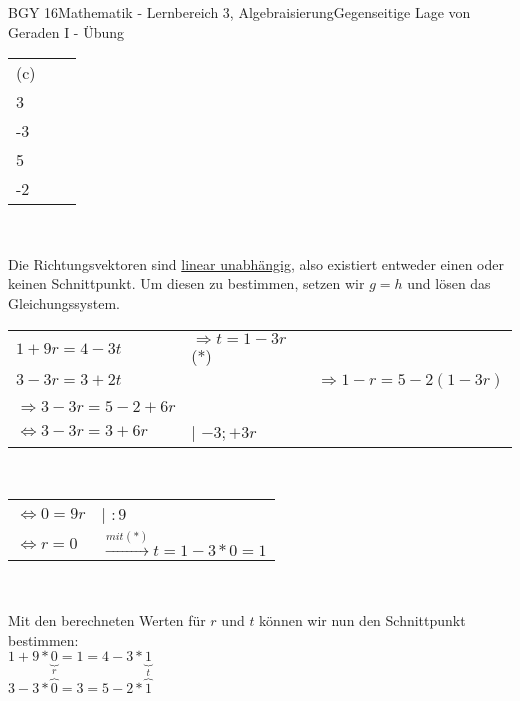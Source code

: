 \documentclass[oneside,openany,headings=optiontotoc,11pt,numbers=noenddot]{scrreprt}
\begin{document}
\begin{worksheet}{BGY 16}{Mathematik - Lernbereich 3, Algebraisierung}{Gegenseitige Lage von Geraden I - Übung}
\begin{framed}
			\begin{tabularx}{\textwidth}{lXX}
				(c) & \(g: \vec{x} = \left(\begin{array}{c}1\\3\end{array}\right) + r\left(\begin{array}{c}9\\-3\end{array}\right)\) &	\(h: \vec{x} = \left(\begin{array}{c}4\\5\end{array}\right) + t\left(\begin{array}{c}-3\\-2\end{array}\right)\)\\
			\end{tabularx}\\
			\par\noindent
			Die Richtungsvektoren sind \color{blue}\underline{linear unabhängig}\normalcolor{}, also existiert entweder \color{red}einen\normalcolor{} oder \color{red}keinen\normalcolor{} Schnittpunkt. Um diesen zu bestimmen, setzen wir \(g=h\) und lösen das Gleichungssystem.\\
			\par\noindent
			\begin{tabular}{lll}
				\(1+9r = 4 -3t\) & \(\Rightarrow t = 1 - 3r\) (*) &\\
				\(3-3r = 3+2t\) & & \(\Rightarrow 1-r = 5 -2(1-3r)\)\\ 
				\hline\\
				\(\Rightarrow 3-3r = 5 - 2+6r\)\\
				\(\Leftrightarrow 3-3r = 3 + 6r\) & | \(-3;+3r\)\\
			\end{tabular}\\
			\begin{tabular}{ll}
				\(\Leftrightarrow 0 = 9r\) & | \(:9\)\\
				\(\Leftrightarrow r = 0\) & \(\xrightarrow{mit (*)} t = 1 -3*0 = 1\)
			\end{tabular}\\
			\par\noindent
			Mit den berechneten Werten für \(r\) und \(t\) können wir nun den Schnittpunkt bestimmen:\\
			\(1 + 9*\underbrace{0}_{r} = 1 = 4 - 3*\underbrace{1}_{t}\)\\
			\(3 - 3*\overbrace{0} = 3 = 5-2*\overbrace{1}\)\\

\end{framed}
\end{worksheet}
\end{document}

